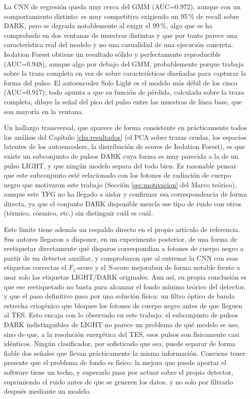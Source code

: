 La CNN de regresión queda muy cerca del GMM (AUC=0.972), aunque con un comportamiento distinto: es muy competitiva exigiendo un 95\,\% de recall sobre DARK, pero se degrada notablemente al exigir el 99\,\%, algo que se ha comprobado en dos ventanas de muestras distintas y que por tanto parece una característica real del modelo y no una casualidad de una ejecución concreta. Isolation Forest obtiene un resultado sólido y perfectamente reproducible (AUC=0.948), aunque algo por debajo del GMM, probablemente porque trabaja sobre la traza completa en vez de sobre características diseñadas para capturar la forma del pulso. El autoencoder Solo Light es el modelo más débil de los cinco (AUC=0.917); todo apunta a que su función de pérdida, calculada sobre la traza completa, diluye la señal del pico del pulso entre las muestras de línea base, que son mayoría en la ventana.

Un hallazgo transversal, que aparece de forma consistente en prácticamente todos los análisis del Capítulo \ref{cha:resultados} (el PCA sobre trazas crudas, los espacios latentes de los autoencoders, la distribución de scores de Isolation Forest), es que existe un subconjunto de pulsos DARK cuya forma es muy parecida a la de un pulso LIGHT, y que ningún modelo separa del todo bien. Es razonable pensar que este subconjunto esté relacionado con los fotones de radiación de cuerpo negro que motivaron este trabajo (Sección \ref{sec:motivacion} del Marco teórico), aunque este TFG no ha llegado a aislar y confirmar esa correspondencia de forma directa, ya que el conjunto DARK disponible mezcla ese tipo de ruido con otros (térmico, cósmico, etc.) sin distinguir cuál es cuál.

Este límite tiene además un respaldo directo en el propio artículo de referencia. Sus autores llegaron a disponer, en un experimento posterior, de una forma de reetiquetar directamente qué disparos correspondían a fotones de cuerpo negro a partir de un detector auxiliar, y comprobaron que al entrenar la CNN con esas etiquetas correctas el $F_1$-score y el $S$-score mejoraban de forma notable frente a usar solo las etiquetas LIGHT/DARK originales. Aun así, su propia conclusión es que ese reetiquetado no basta para alcanzar el fondo mínimo teórico del detector, y que el paso definitivo pasa por una solución física: un filtro óptico de banda estrecha criogénico que bloquee los fotones de cuerpo negro antes de que lleguen al TES. Esto encaja con lo observado en este trabajo: el subconjunto de pulsos DARK indistinguibles de LIGHT no parece un problema de qué modelo se use, sino de que, a la resolución energética del TES, esos pulsos son físicamente casi idénticos. Ningún clasificador, por sofisticado que sea, puede separar de forma fiable dos señales que llevan prácticamente la misma información. Conviene tener presente que el problema de fondo es físico: la mejora que puede aportar el software tiene un techo, y superarlo pasa por actuar sobre el propio detector, suprimiendo el ruido antes de que se generen los datos, y no solo por filtrarlo después mediante un modelo.

